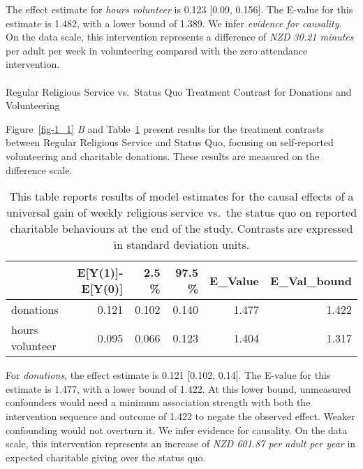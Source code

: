 \documentclass[
  single column]{article}
\makeatletter
\let\oldparagraph\paragraph
\renewcommand{\paragraph}{
    \@ifstar
      \xxxParagraphStar
      \xxxParagraphNoStar
  }
\newcommand{\xxxParagraphStar}[1]{\oldparagraph*{#1}\mbox{}}
\newcommand{\xxxParagraphNoStar}[1]{\oldparagraph{#1}\mbox{}}
\makeatother
\begin{document}
The effect estimate for \emph{hours volunteer} is 0.123 {[}0.09,
0.156{]}. The E-value for this estimate is 1.482, with a lower bound of
1.389. We infer \emph{evidence for causality}. On the data scale, this
intervention represents a difference of \emph{NZD 30.21 minutes} per
adult per week in volunteering compared with the zero attendance
intervention.

\paragraph{Regular Religious Service vs.~Status Quo Treatment Contrast
for Donations and
Volunteering}\label{regular-religious-service-vs.-status-quo-treatment-contrast-for-donations-and-volunteering}

Figure~\ref{fig-1_1} \emph{B} and Table~\ref{tbl-1_2} present results
for the treatment contrasts between Regular Religious Service and Status
Quo, focusing on self-reported volunteering and charitable donations.
These results are measured on the difference scale.

\begin{longtable}[]{@{}lrrrrr@{}}

\caption{\label{tbl-1_2}This table reports results of model estimates
for the causal effects of a universal gain of weekly religious service
vs.~the status quo on reported charitable behaviours at the end of the
study. Contrasts are expressed in standard deviation units.}

\tabularnewline

\toprule\noalign{}
& E{[}Y(1){]}-E{[}Y(0){]} & 2.5 \% & 97.5 \% & E\_Value &
E\_Val\_bound \\
\midrule\noalign{}
\endhead
\bottomrule\noalign{}
\endlastfoot
donations & 0.121 & 0.102 & 0.140 & 1.477 & 1.422 \\
hours volunteer & 0.095 & 0.066 & 0.123 & 1.404 & 1.317 \\

\end{longtable}

For \emph{donations}, the effect estimate is 0.121 {[}0.102, 0.14{]}.
The E-value for this estimate is 1.477, with a lower bound of 1.422. At
this lower bound, unmeasured confounders would need a minimum
association strength with both the intervention sequence and outcome of
1.422 to negate the observed effect. Weaker confounding would not
overturn it. We infer evidence for causality. On the data scale, this
intervention represents an increase of \emph{NZD 601.87 per adult per
year} in expected charitable giving over the status quo.
\end{document}
